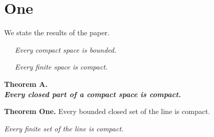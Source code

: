 \documentclass{article}
\begin{document}
\section{One}
We state the results of the paper.

 \ \ \ {\it Every compact space is
bounded.}

\bigbreak
{} \ \ \ {\it Every finite space is compact.}

\noindent
\bf {Theorem A}. \\
{\it \rm Every closed part of a compact space is compact.}

{\bf Theorem One.} Every bounded closed set of the line is compact.

 {\it Every finite set of the line is compact.}
\end{document}
